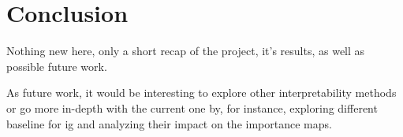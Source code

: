 
\chapter{Conclusion}
\label{ch:Conclusion}

Nothing new here, only a short recap of the project, it's results, as well as possible future work.

As future work, it would be interesting to explore other interpretability  methods or go more in-depth with the current one by, for instance, exploring different baseline for \acrlong{ig} and analyzing their impact on the importance maps.


